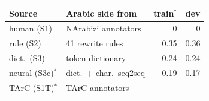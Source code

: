 \begin{tabular}{llrr}
\toprule
Source & Arabic side from & train$^{\dagger}$ & dev \\
\midrule
human (S1) & NArabizi annotators & 0 & 0 \\
rule (S2) & 41 rewrite rules & 0.35 & 0.36 \\
dict.\ (S3) & token dictionary & 0.24 & 0.24 \\
neural (S3c)$^{\ast}$ & dict.\ + char.\ seq2seq & 0.19 & 0.17 \\
TArC (S1T)$^{\ast}$ & TArC annotators & -- & -- \\
\bottomrule
\end{tabular}
